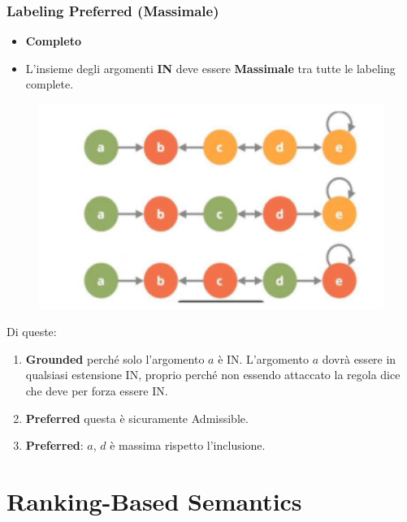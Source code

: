     \subsection{Labeling Preferred (Massimale)}
    \begin{itemize}
        \item \textbf{Completo}
        \item L'insieme degli argomenti \textbf{IN} deve essere
              \textbf{Massimale} tra tutte le labeling complete.
    \end{itemize}
    \begin{figure}[H]
        \centering
        \includegraphics[width=12cm, keepaspectratio]{img/Cap7/GR.png}
    \end{figure}
    Di queste:
    \begin{enumerate}
        \item \textbf{Grounded} perché solo l'argomento $a$ è IN. L'argomento
              $a$ dovrà essere in qualsiasi estensione IN, proprio perché non essendo
              attaccato la regola dice che deve per forza essere IN.
        \item \textbf{Preferred} questa è sicuramente Admissible.
        \item \textbf{Preferred}: $a$, $d$ è massima rispetto l'inclusione.
    \end{enumerate}


    \chapter{Ranking-Based Semantics} \label{Ranking-Based Semantics}
